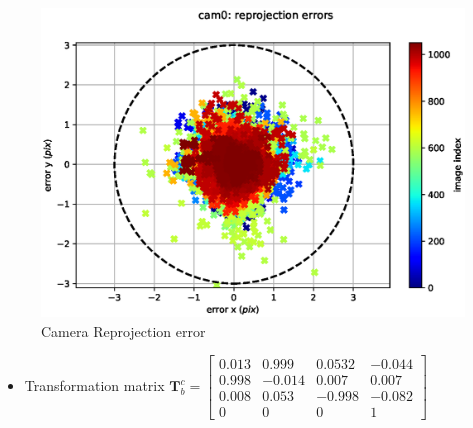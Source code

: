 \documentclass[10pt]{beamer}
\begin{document}
\begin{frame}{}
\begin{minipage}{0.47\textwidth}
\begin{itemize}
\end{itemize}
	\end{minipage}
	\begin{minipage}{0.47\textwidth}
		\begin{figure}[h!]
			\centering
			\includegraphics[scale=0.35]{Camera_Reprojection.eps} 
			\caption{Camera Reprojection error}
			\label{Fig:cam_reproj}
		\end{figure}
	\end{minipage}
        \begin{itemize}
    \item Transformation matrix $\mathbf{T}_{b}^{c} = \begin{bmatrix}
        0.013 & 0.999 & 0.0532  & -0.044\\
       0.998 & -0.014 & 0.007  & 0.007\\ 
       0.008 & 0.053 &  -0.998 & -0.082\\
       0 & 0 & 0 & 1
    \end{bmatrix}$
\end{itemize}
\end{frame}
\end{document}
